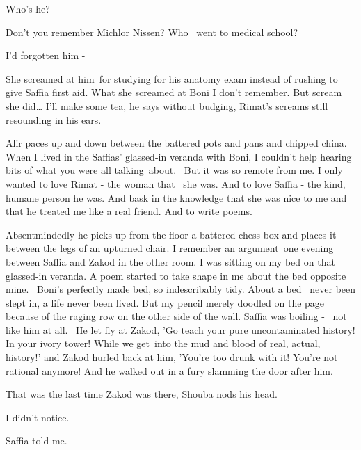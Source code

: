 \documentclass[letterpaper]{article}
\begin{document}
{\textquotedbl}Who's he?{\textquotedbl} 

{\textquotedbl}Don't you remember Michlor Nissen? Who \ went to medical school?{\textquotedbl} 

{\textquotedbl}I'd forgotten him -{\textquotedbl} 

{\textquotedbl}She screamed at him~for studying for his anatomy exam instead of rushing to give Saffia first aid. What
she screamed at Boni I don't remember. But scream she did{\dots} I'll make some tea,{\textquotedbl} he says without
budging, Rimat's screams still resounding in his ears. 

Alir paces up and down between the battered pots and pans and chipped china. {\textquotedbl}When I lived in the Saffias'
glassed-in veranda with Boni, I couldn't help hearing bits of what you were all talking~about.~ But it was so remote
from me. I only wanted to love Rimat - the woman that \ she was. And to love Saffia - the kind, humane person he was.
And bask in the knowledge that she was nice to me and that he treated me like a real friend. And to write
poems.{\textquotedbl} 

Absentmindedly he picks up from the floor a battered chess box and places it between the legs of an upturned chair.
{\textquotedbl}I remember an argument~one evening between Saffia and Zakod in the other room. I was sitting on my bed
on that glassed-in veranda. A poem started to take shape in me about the bed opposite mine.~ Boni's perfectly made bed,
so indescribably tidy. About a bed \ never been slept in, a life never been lived. But my pencil merely doodled on the
page because of the raging row on the other side of the wall. Saffia was boiling - \ not like him at all. \ He let fly
at Zakod, 'Go teach your pure uncontaminated history! In your ivory tower! While we get~into the mud and blood of real,
actual, history!' and Zakod hurled back at him, 'You're too drunk with it! You're not rational anymore!{\textquotedbl}
And he walked out in a fury slamming the door after him. 

{\textquotedbl}That was the last time Zakod was there,{\textquotedbl} Shouba nods his head.

{\textquotedbl}I didn't notice.{\textquotedbl} 

{\textquotedbl}Saffia told me.{\textquotedbl}
\end{document}
